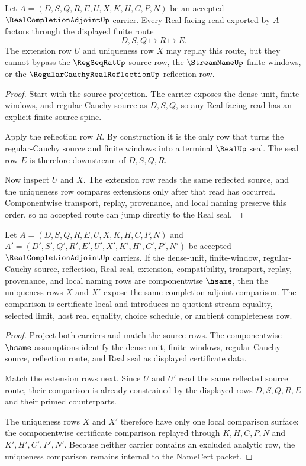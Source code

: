 \begin{theorem}
\label{thm:real-completion-adjoint-reflection}
Let $A=(D,S,Q,R,E,U,X,K,H,C,P,N)$ be an accepted $\RealCompletionAdjointUp$ carrier. Every Real-facing read exported by $A$ factors through the displayed finite route
$$
D,S,Q \longmapsto R \longmapsto E .
$$
The extension row $U$ and uniqueness row $X$ may replay this route, but they cannot bypass the $\RegSeqRatUp$ source row, the $\StreamNameUp$ finite windows, or the $\RegularCauchyRealReflectionUp$ reflection row.
\end{theorem}
\begin{proof}
Start with the source projection. The carrier exposes the dense unit, finite windows, and regular-Cauchy source as $D,S,Q$, so any Real-facing read has an explicit finite source spine.

Apply the reflection row $R$. By construction it is the only row that turns the regular-Cauchy source and finite windows into a terminal $\RealUp$ seal. The seal row $E$ is therefore downstream of $D,S,Q,R$.

Now inspect $U$ and $X$. The extension row reads the same reflected source, and the uniqueness row compares extensions only after that read has occurred. Componentwise transport, replay, provenance, and local naming preserve this order, so no accepted route can jump directly to the Real seal.
\end{proof}

\begin{theorem}
\label{thm:real-completion-adjoint-uniqueness}
Let $A=(D,S,Q,R,E,U,X,K,H,C,P,N)$ and $A'=(D',S',Q',R',E',U',X',K',H',C',P',N')$ be accepted $\RealCompletionAdjointUp$ carriers. If the dense-unit, finite-window, regular-Cauchy source, reflection, Real seal, extension, compatibility, transport, replay, provenance, and local naming rows are componentwise $\hsame$, then the uniqueness rows $X$ and $X'$ expose the same completion-adjoint comparison. The comparison is certificate-local and introduces no quotient stream equality, selected limit, host real equality, choice schedule, or ambient completeness row.
\end{theorem}
\begin{proof}
Project both carriers and match the source rows. The componentwise $\hsame$ assumptions identify the dense unit, finite windows, regular-Cauchy source, reflection route, and Real seal as displayed certificate data.

Match the extension rows next. Since $U$ and $U'$ read the same reflected source route, their comparison is already constrained by the displayed rows $D,S,Q,R,E$ and their primed counterparts.

The uniqueness rows $X$ and $X'$ therefore have only one local comparison surface: the componentwise certificate comparison replayed through $K,H,C,P,N$ and $K',H',C',P',N'$. Because neither carrier contains an excluded analytic row, the uniqueness comparison remains internal to the NameCert packet.
\end{proof}

